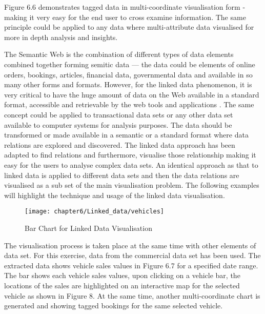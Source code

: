Figure 6.6 demonstrates tagged data in multi-coordinate visualisation form - making it very easy for the end user to cross examine information. The same principle could be applied to any data where multi-attribute data visualised for more in depth analysis and insights.



The Semantic Web is the combination of different types of data elements combined together forming semitic data — the data could be elements of online orders, bookings, articles, financial data, governmental data and available in so many other forms and formats. However, for the linked data phenomenon, it is very critical to have the huge amount of data on the Web available in a standard format, accessible and retrievable by the web tools and applications \cite{bizer2009linked}. The same concept could be applied to transactional data sets or any other data set available to computer systems for analysis purposes. The data should be transformed or made available in a semantic or a standard format where data relations are explored and discovered. The linked data approach has been adapted to find relations and furthermore, visualise those relationship making it easy for the users to analyse complex data sets. An identical approach as that to linked data is applied to different data sets and then the data relations are visualised as a sub set of the main visualisation problem. The following examples will highlight the technique and usage of the linked data visualisation.

\begin{figure}
\centering
\texttt{[image: chapter6/Linked\_data/vehicles]}
\caption{Bar Chart for Linked Data Visualisation}
\end{figure}

The visualisation process is taken place at the same time with other elements of data set. For this exercise, data from the commercial data set has been used. The extracted data shows vehicle sales values in Figure 6.7 for a specified date range. The bar shows each vehicle sales values, upon clicking on a vehicle bar, the locations of the sales are highlighted on an interactive map for the selected vehicle as shown in Figure 8. At the same time, another multi-coordinate chart is generated and showing tagged bookings for the same selected vehicle.

